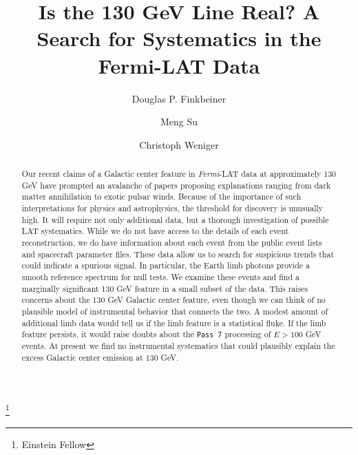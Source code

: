 \documentclass[aps,twocolumn,prd,superscriptaddress,showpacs,nofootinbib,fixfloat]{revtex4}
\newcommand{\Fermi}{{\slshape Fermi}}
\begin{document}
\title{Is the 130 GeV Line Real? 
  A Search for Systematics in the Fermi-LAT Data}

\author{Douglas P. Finkbeiner}

\author{Meng Su}
\footnote{Einstein Fellow}

\author{Christoph Weniger}

\begin{abstract} Our recent claims of a Galactic center
  feature in \Fermi-LAT data at approximately 130 GeV have
  prompted an avalanche of papers proposing explanations
  ranging from dark matter annihilation to exotic pulsar
  winds.  Because of the importance of such interpretations
  for physics and astrophysics, the threshold for discovery
  is unusually high.  It will require not only additional
  data, but a thorough investigation of possible LAT
  systematics.  While we do not have access to the details
  of each event reconstruction, we do have information about
  each event from the public event lists and spacecraft
  parameter files.  These data allow us to search for
  suspicious trends that could indicate a spurious signal.
  In particular, the Earth limb photons provide a smooth
  reference spectrum for null tests.  We examine these
  events and find a marginally significant 130 GeV feature
  in a small subset of the data.  This raises concerns about
  the 130 GeV Galactic center feature, even though we can
  think of no plausible model of instrumental behavior that
  connects the two.  A modest amount of additional limb data
  would tell us if the limb feature is a statistical fluke.
  If the limb feature persists, it would raise doubts
  about the \texttt{Pass 7} processing of $E > 100$ GeV events.  At present
  we find no instrumental systematics that could plausibly explain the excess
  Galactic center emission at 130 GeV. 
\end{abstract}
\end{document}
